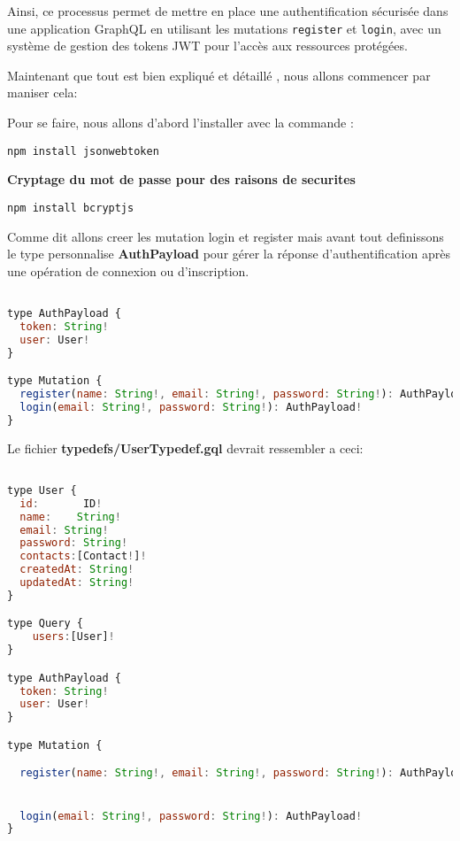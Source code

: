 \documentclass{article}
\begin{document}
Ainsi, ce processus permet de mettre en place une authentification sécurisée dans une application GraphQL en utilisant les mutations \texttt{register} et \texttt{login}, avec un système de gestion des tokens JWT pour l'accès aux ressources protégées.


Maintenant que tout est bien expliqué et détaillé , nous allons commencer par maniser cela:

Pour se faire, nous allons d'abord l'installer  avec la commande :

    \begin{lstlisting}[style=custombash]
 npm install jsonwebtoken
    \end{lstlisting}


   \item \textbf{Cryptage du mot de passe pour des raisons de securites}
    \begin{lstlisting}[style=custombash]
npm install bcryptjs
    \end{lstlisting}

Comme dit allons creer les mutation login et register mais avant tout definissons le type personnalise \textbf{AuthPayload} pour gérer la réponse d'authentification après une opération de connexion ou d'inscription.



\begin{lstlisting}[language=JavaScript]

type AuthPayload {
  token: String!
  user: User!
}

type Mutation {
  register(name: String!, email: String!, password: String!): AuthPayload!
  login(email: String!, password: String!): AuthPayload!
}
    \end{lstlisting}
Le fichier \textbf{typedefs/UserTypedef.gql } devrait ressembler a ceci:


\begin{lstlisting}[language=JavaScript]

type User {
  id:       ID!      
  name:    String!   
  email: String!   
  password: String!
  contacts:[Contact!]!   
  createdAt: String!  
  updatedAt: String!   
}

type Query {
    users:[User]!
}

type AuthPayload {
  token: String!
  user: User!
}

type Mutation {

  register(name: String!, email: String!, password: String!): AuthPayload!


  login(email: String!, password: String!): AuthPayload!
}

    \end{lstlisting}
    
\end{document}
